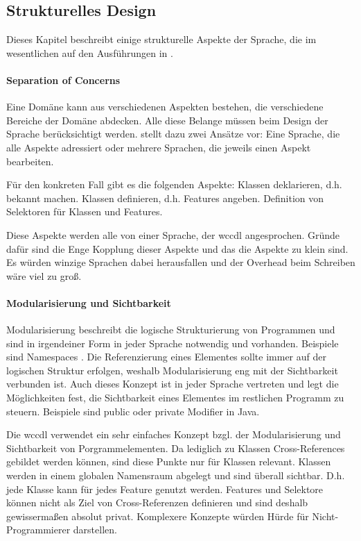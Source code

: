 \subsection{Strukturelles Design}
    Dieses Kapitel beschreibt einige strukturelle Aspekte der Sprache,
    die im wesentlichen auf den Ausführungen in \cite[Kapitel 4, 5.1]{voelter:DslEngineering}.

    \paragraph{Separation of Concerns}
    Eine Domäne kann aus verschiedenen Aspekten bestehen,
    die verschiedene Bereiche der Domäne abdecken.
    Alle diese Belange müssen beim Design der Sprache berücksichtigt werden.
    \citet[Kapitel 4.1]{voelter:DslEngineering}
    stellt dazu zwei Ansätze vor: Eine Sprache, die alle Aspekte adressiert
    oder mehrere Sprachen, die jeweils einen Aspekt bearbeiten.

    Für den konkreten Fall gibt es die folgenden Aspekte:
    Klassen deklarieren, d.h. bekannt machen.
    Klassen definieren, d.h. Features angeben.
    Definition von Selektoren für Klassen und Features.

    Diese Aspekte werden alle von einer Sprache, der \gls{wccdl}
    angesprochen.
    Gründe dafür sind die Enge Kopplung dieser Aspekte
    und das die Aspekte zu klein sind.
    Es würden winzige Sprachen dabei herausfallen
    und der Overhead beim Schreiben wäre viel zu groß.

    \paragraph{Modularisierung und Sichtbarkeit}
    Modularisierung beschreibt die logische Strukturierung
    von Programmen und sind in irgendeiner Form in jeder Sprache
    notwendig und vorhanden.
    Beispiele sind Namespaces
    \cite[Kapitel 5.1.1]{voelter:DslEngineering}.
    Die Referenzierung eines Elementes sollte immer auf der logischen
    Struktur erfolgen, weshalb Modularisierung eng mit der Sichtbarkeit
    verbunden ist.
    Auch dieses Konzept ist in jeder Sprache vertreten und legt
    die Möglichkeiten fest, die Sichtbarkeit eines Elementes im restlichen Programm zu steuern.
    Beispiele sind public oder private Modifier in Java.

    Die \gls{wccdl} verwendet ein sehr einfaches Konzept bzgl.
    der Modularisierung und Sichtbarkeit von Porgrammelementen.
    Da lediglich zu Klassen Cross-References gebildet werden können,
    sind diese Punkte nur für Klassen relevant.
    Klassen werden in einem globalen Namensraum abgelegt und sind überall sichtbar.
    D.h. jede Klasse kann für jedes Feature genutzt werden.
    Features und Selektore können nicht als Ziel von Cross-Referenzen definieren
    und sind deshalb gewissermaßen absolut privat. %
    Komplexere Konzepte würden Hürde für Nicht-Programmierer darstellen.

